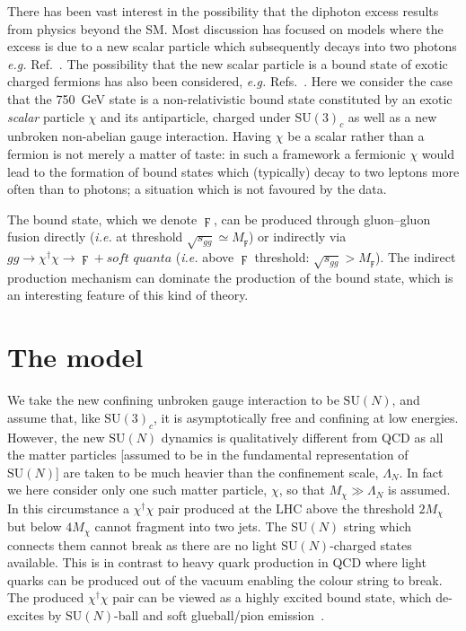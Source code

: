 There has been vast interest in the possibility that the diphoton excess results
from physics beyond the SM. Most discussion has focused on models where the
excess is due to a new scalar particle which subsequently decays into two
photons \textit{e.g.} Ref.~\cite{Franceschini:2015kwy}. The possibility that the
new scalar particle is a bound state of exotic charged fermions has also been
considered, \textit{e.g.} Refs.~\cite{Kats:2016kuz, Curtin:2015jcv,
  Kamenik:2016izk, Ko:2016sht, Barrie:2016ndh}. Here we consider the case that
the \SI{750}{\GeV} state is a non-relativistic bound state constituted by an
exotic \textit{scalar} particle $\chi$ and its antiparticle, charged under
$\mathrm{SU}(3)_{c}$ as well as a new unbroken non-abelian gauge interaction.
Having $\chi$ be a scalar rather than a fermion is not merely a matter of taste:
in such a framework a fermionic $\chi$ would lead to the formation of bound
states which (typically) decay to two leptons more often than to photons; a
situation which is not favoured by the data.

The bound state, which we denote $\digamma$, can be produced through
gluon--gluon fusion directly (\textit{i.e.} at threshold
$\sqrt{s_{gg}} \simeq M_\digamma$) or indirectly via
$gg \rightarrow \chi^\dagger \chi \rightarrow \digamma + \textit{soft quanta}$
(\textit{i.e.} above $\digamma$ threshold: $\sqrt{s_{gg}} > M_\digamma$). The
indirect production mechanism can dominate the production of the bound state,
which is an interesting feature of this kind of theory.

\section{The model}

We take the new confining unbroken gauge interaction to be $\mathrm{SU}(N)$, and
assume that, like $\mathrm{SU}(3)_{c}$, it is asymptotically free and confining
at low energies. However, the new $\mathrm{SU}(N)$ dynamics is qualitatively
different from QCD as all the matter particles [assumed to be in the fundamental
representation of $\mathrm{SU}(N)$] are taken to be much heavier than the
confinement scale, $\Lambda_{N}$. In fact we here consider only one such matter
particle, $\chi$, so that $M_\chi \gg \Lambda_{N}$ is assumed. In this
circumstance a $\chi^\dagger \chi$ pair produced at the LHC above the threshold
$2M_\chi$ but below $4M_\chi$ cannot fragment into two jets. The
$\mathrm{SU}(N)$ string which connects them cannot break as there are no light
$\mathrm{SU}(N)$-charged states available. This is in contrast to heavy quark
production in QCD where light quarks can be produced out of the vacuum enabling
the colour string to break. The produced $\chi^\dagger\chi$ pair can be viewed
as a highly excited bound state, which de-excites by $\mathrm{SU}(N)$-ball and
soft glueball/pion emission~\cite{Carlson:1991zn}.

